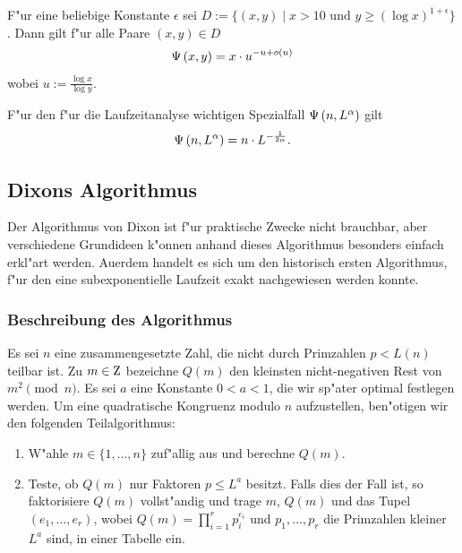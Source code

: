 \begin{satz}
  F"ur eine beliebige Konstante $\epsilon$ sei $D:=\{(x,y) \mid x>10
  \mbox{ und } y \ge (\log x)^{1+\epsilon}\}$. Dann gilt f"ur alle
  Paare $(x,y)\in D$
  $$ \Psi\left( x,y \right) = x \cdot u^{-u+o(u)} $$
  wobei $u:=\frac{\log x}{\log y}$.
\end{satz}

\begin{lemma} \label{spezialfall}
  F"ur den f"ur die Laufzeitanalyse wichtigen Spezialfall 
  $\Psi\left( n,L^{\alpha} \right)$ gilt
  \begin{equation}
    \Psi\left( n,L^{\alpha} \right) = n \cdot L^{-\frac{1}{2\alpha}}.
  \end{equation}
\end{lemma}


\subsection{Dixons Algorithmus}

Der Algorithmus von Dixon ist f"ur praktische Zwecke nicht brauchbar,
aber verschiedene Grundideen k"onnen anhand dieses Algorithmus
besonders einfach erkl"art werden.  Au\3erdem handelt es sich um den
historisch ersten Algorithmus, f"ur den eine subexponentielle Laufzeit
exakt nachgewiesen werden konnte.

\subsubsection{Beschreibung des Algorithmus}

Es sei $n$ eine zusammengesetzte Zahl, die nicht durch Primzahlen
$p<L(n)$ teilbar ist. Zu $m\in\Z$ bezeichne $Q(m)$ den kleinsten
nicht-negativen Rest von $m^2 \pmod{n}$. Es sei $a$ eine Konstante $0
< a < 1$, die wir sp"ater optimal festlegen werden. Um eine
quadratische Kongruenz modulo $n$ aufzustellen, ben"otigen wir den
folgenden Teilalgorithmus:

\begin{enumerate}  
  \item W"ahle $m\in\{1,\ldots,n\}$ zuf"allig aus und berechne $Q(m)$.

  \item Teste, ob $Q(m)$ nur Faktoren $p\le L^a$ besitzt. Falls dies
        der Fall ist, so faktorisiere $Q(m)$ vollst"andig und trage
        $m$, $Q(m)$ und das Tupel $(e_1,\ldots, e_r)$, wobei
        $Q(m)=\prod_{i=1}^{r} p_i^{e_i}$ und $p_1,\ldots,p_r$ die
        Primzahlen kleiner $L^a$ sind, in einer Tabelle ein.
\end{enumerate}

